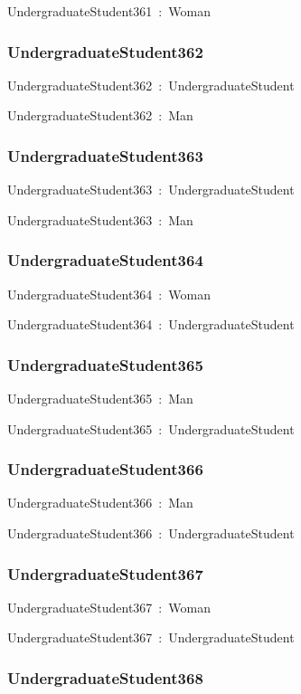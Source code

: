 \documentclass{article}
\begin{document}
UndergraduateStudent361~:~Woman

\subsubsection*{UndergraduateStudent362}

UndergraduateStudent362~:~UndergraduateStudent

UndergraduateStudent362~:~Man

\subsubsection*{UndergraduateStudent363}

UndergraduateStudent363~:~UndergraduateStudent

UndergraduateStudent363~:~Man

\subsubsection*{UndergraduateStudent364}

UndergraduateStudent364~:~Woman

UndergraduateStudent364~:~UndergraduateStudent

\subsubsection*{UndergraduateStudent365}

UndergraduateStudent365~:~Man

UndergraduateStudent365~:~UndergraduateStudent

\subsubsection*{UndergraduateStudent366}

UndergraduateStudent366~:~Man

UndergraduateStudent366~:~UndergraduateStudent

\subsubsection*{UndergraduateStudent367}

UndergraduateStudent367~:~Woman

UndergraduateStudent367~:~UndergraduateStudent

\subsubsection*{UndergraduateStudent368}
\end{document}
